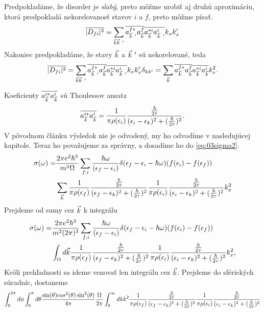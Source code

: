 Predpokladáme, že disorder je {\it slabý}, preto môžme urobiť aj druhú aproximáciu, ktorá predpokladá nekorelovanosť stavov $i$ a $f$, preto môžme písať.
\begin{align}
\overline{|D_{fi}|^2}=\sum_{\vk\vk\ '}\overline{a^{f*}_{\vk\ '}a^f_{\vk}}\overline{a^{*i}_{\vk}a^i_{\vk\ '}}k_xk_x' 
\end{align}
Nakoniec predpokladáme, že stavy $\vec{k}$ a $\vk\ '$ sú nekorelované, teda
\begin{align}
\label{eq:03dfisq3}
\overline{|D_{fi}|^2}=\sum_{\vk\vk\ '}\overline{a^{f*}_{\vk\ '}a^f_{\vk}}\overline{a^{*i}_{\vk}a^i_{\vk\ '}}k_xk_x'\delta_{kk'}=\sum_{\vk}\overline{a^{f*}_{\vk}a^f_{\vk}}\overline{a^{*i}_{\vk}a^i_{\vk}}k_x^2\text{.}
\end{align}


Koeficienty  $\overline{a_{\vec{k}}^{i*}a_{\vec{k}}^i}$  sú Thoulessov ansatz
\begin{align}
\label{eq:03lorenz}
\overline{a_{\vec{k}}^{i*}a_{\vec{k}}^i}=\frac{1}{\pi\rho(\epsilon_i)}\frac{\frac{\hbar}{2\tau}}{(\epsilon_i-\epsilon_{k})^2+(\frac{\hbar}{2\tau})^2}\text{.}
\end{align}
V pôvodnom článku výsledok nie je odvodený, my ho odvodíme v nasledujúcej kapitole. Teraz ho považujeme za správny, a dosadíme ho do \eqref{eq:03sigma2}.
\begin{align}
\sigma(\omega)=&\frac{2\pi e^2\hbar^3}{m^2\Omega}\sum_{f,i}\frac{\hbar\omega}{(\epsilon_f-\epsilon_i)}\delta(\epsilon_f-\epsilon_i-\hbar\omega)(f(\epsilon_i)-f(\epsilon_f))\\ \notag
&\sum_{\vec{k}}\frac{1}{\pi\rho(\epsilon_f)}\frac{\frac{\hbar}{2\tau}}{(\epsilon_f-\epsilon_{k})^2+(\frac{\hbar}{2\tau})^2}\frac{1}{\pi\rho(\epsilon_i)}\frac{\frac{\hbar}{2\tau}}{(\epsilon_i-\epsilon_{k})^2+(\frac{\hbar}{2\tau})^2}k_x^2
\end{align}
Prejdeme od sumy cez $\vec{k}$ k integrálu
\begin{align}
\label{eq:03sigma3}
\sigma(\omega)=&\frac{2\pi e^2\hbar^3}{m^2(2\pi)^3}\sum_{f,i}\frac{\hbar\omega}{(\epsilon_f-\epsilon_i)}\delta(\epsilon_f-\epsilon_i-\hbar\omega)(f(\epsilon_i)-f(\epsilon_f))\\ \notag
&\int_{\Omega}d\vec{k}\frac{1}{\pi\rho(\epsilon_f)}\frac{\frac{\hbar}{2\tau}}{(\epsilon_f-\epsilon_{k})^2+(\frac{\hbar}{2\tau})^2}\frac{1}{\pi\rho(\epsilon_i)}\frac{\frac{\hbar}{2\tau}}{(\epsilon_i-\epsilon_{k})^2+(\frac{\hbar}{2\tau})^2}k_x^2\text{,}
\end{align}
 Kvôli prehľadnosti sa ideme venovať len integrálu cez $\vec{k}$. Prejdeme do sférických súradníc, dostaneme
\begin{align}
\int_0^{2\pi}d\phi\int_0^\pi d\theta \frac{\sin(\theta)cos^2(\theta)\sin^2(\theta)}{4\pi} \frac{\Omega}{2\pi} \int_0^\infty dk k^2 \frac{1}{\pi\rho(\epsilon_f)}\frac{\frac{\hbar}{2\tau}}{(\epsilon_f-\epsilon_{k})^2+(\frac{\hbar}{2\tau})^2} \frac{1}{\pi\rho(\epsilon_i)}\frac{\frac{\hbar}{2\tau}}{(\epsilon_i-\epsilon_{k})^2+(\frac{\hbar}{2\tau})^2} 
\end{align}
